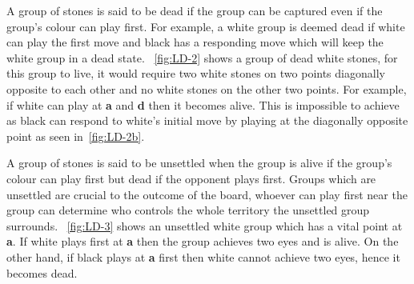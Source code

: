 \documentclass{l4proj}
\newcommand{\bo}[1]{\textbf{#1}}
\begin{document}
A group of stones is said to be dead if the group can be captured even if the group’s colour can play first. For example, a white group is deemed dead if white can play the first move and black has a responding move which will keep the white group in a dead state. ~\autoref{fig:LD-2} shows a group of dead white stones, for this group to live, it would require two white stones on two points diagonally opposite to each other and no white stones on the other two points. For example, if white can play at \bo{a} and \bo{d} then it becomes alive. This is impossible to achieve as black can respond to white’s initial move by playing at the diagonally opposite point as seen in~\autoref{fig:LD-2b}.


A group of stones is said to be unsettled when the group is alive if the group’s colour can play first but dead if the opponent plays first. Groups which are unsettled are crucial to the outcome of the board, whoever can play first near the group can determine who controls the whole territory the unsettled group surrounds. ~\autoref{fig:LD-3} shows an unsettled white group which has a vital point at \bo{a}. If white plays first at \bo{a} then the group achieves two eyes and is alive. On the other hand, if black plays at \bo{a} first then white cannot achieve two eyes, hence it becomes dead.
\end{document}
